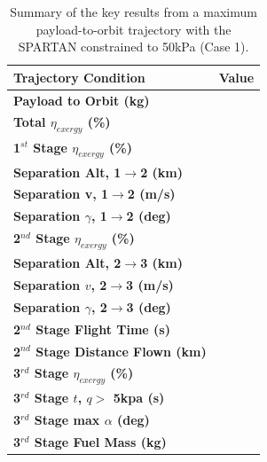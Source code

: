 \begin{table}[ht]
	\centering
	
	\begin{tabular}{l c } 
		\hline \textbf{Trajectory Condition}
		&Value
		\\
		\hline \textbf{Payload to Orbit (kg)}
		& \textbf{\PayloadToOrbitConstqNoReturn}
		\\
		\textbf{Total $\eta_{exergy}$ (\%)}
		& \textbf{\totalExergyEffConstqNoReturn}
		\\
		\hline 
		\textbf{1$^{st}$ Stage $\eta_{exergy}$ (\%)}
		& \textbf{\firstExergyEffConstqNoReturn}
		\\
	
		\textbf{Separation Alt, 1$\rightarrow$2 (km)}
		& \firstsecondSeparationAltConstqNoReturn
		\\
		\textbf{Separation v, 1$\rightarrow$2 (m/s)}
		& \firstsecondSeparationvConstqNoReturn
		\\
		\textbf{Separation $\gamma$, 1$\rightarrow$2 (deg)}
		& \firstsecondSeparationgammaConstqNoReturn
		\\
		\hline 
		\textbf{2$^{nd}$ Stage $\eta_{exergy}$ (\%)}
		& \textbf{\secondExergyEffConstqNoReturn}
		\\
		\textbf{Separation Alt, 2$\rightarrow$3 (km)}
		& \secondthirdSeparationAltConstqNoReturn
		\\
		\textbf{Separation $v$, 2$\rightarrow$3 (m/s)}
		& \secondthirdSeparationvConstqNoReturn
		\\
		\textbf{Separation $\gamma$, 2$\rightarrow$3 (deg)}
		& \secondthirdSeparationgammaConstqNoReturn
		\\
		\textbf{2$^{nd}$ Stage Flight Time (s)}
		& \secondFlightTimeConstqNoReturn
		\\
		\textbf{2$^{nd}$ Stage Distance Flown (km)}
		& \SecondDistConstqNoReturn
		\\
		\hline 
		\textbf{3$^{rd}$ Stage $\eta_{exergy}$ (\%)}
		& \textbf{\thirddExergyEffConstqNoReturn}
		\\
	
		\textbf{3$^{rd}$ Stage $t$, $q >$ 5kpa (s)}
		& \thirdqOverFiveConstqNoReturn
		\\
		\textbf{3$^{rd}$ Stage max $\alpha$ (deg)}
		& \thirdmaxAoAConstqNoReturn
		\\
		\textbf{3$^{rd}$ Stage Fuel Mass (kg)}
		& \thirdmFuelConstqNoReturn
		\\
		\hline 
	\end{tabular} 
	
	\caption{Summary of the key results from a maximum payload-to-orbit trajectory with the SPARTAN constrained to 50kPa (Case 1).}
	\label{tab:constqsummary}
\end{table}
